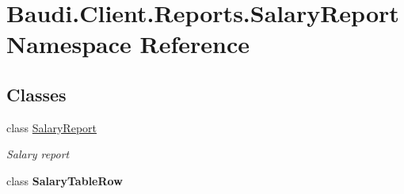 \hypertarget{namespace_baudi_1_1_client_1_1_reports_1_1_salary_report}{}\section{Baudi.\+Client.\+Reports.\+Salary\+Report Namespace Reference}
\label{namespace_baudi_1_1_client_1_1_reports_1_1_salary_report}
\subsection*{Classes}
\begin{DoxyCompactItemize}
\item 
class \hyperlink{class_baudi_1_1_client_1_1_reports_1_1_salary_report_1_1_salary_report}{Salary\+Report}
\begin{DoxyCompactList}\small\item\em Salary report \end{DoxyCompactList}\item 
class {\bfseries Salary\+Table\+Row}
\end{DoxyCompactItemize}
